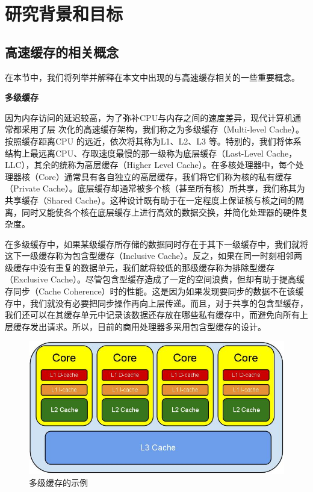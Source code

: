 
\chapter{研究背景和目标} \label{chap:related}
\section{高速缓存的相关概念}
在本节中，我们将列举并解释在本文中出现的与高速缓存相关的一些重要概念。

\textbf{多级缓存}

因为内存访问的延迟较高，为了弥补CPU与内存之间的速度差异，现代计算机通常都采用了层
次化的高速缓存架构，我们称之为多级缓存（Multi-level Cache）。按照缓存距离CPU 的远近，依次将其称为L1、L2、L3 等。特别的，我们将体系结构上最远离CPU、存取速度最慢的那一级称为底层缓存（Last-Level Cache，LLC），其余的统称为高层缓存（Higher Level Cache）。在多核处理器中，每个处理器核（Core）通常具有各自独立的高层缓存，我们将它们称为核的私有缓存（Private Cache）。底层缓存却通常被多个核（甚至所有核）所共享，我们称其为共享缓存（Shared Cache）。这种设计既有助于在一定程度上保证核与核之间的隔离，同时又能使各个核在底层缓存上进行高效的数据交换，并简化处理器的硬件复杂度。

在多级缓存中，如果某级缓存所存储的数据同时存在于其下一级缓存中，我们就将这下一级缓存称为包含型缓存（Inclusive Cache）。反之，如果在同一时刻相邻两级缓存中没有重复的数据单元，我们就将较低的那级缓存称为排除型缓存（Exclusive Cache）。尽管包含型缓存造成了一定的空间浪费，但却有助于提高缓存同步（Cache Coherence）时的性能。这是因为如果发现要同步的数据不在该缓存中，我们就没有必要把同步操作再向上层传递。而且，对于共享的包含型缓存，我们还可以在其缓存单元中记录该数据还存放在哪些私有缓存中，而避免向所有上层缓存发出请求。所以，目前的商用处理器多采用包含型缓存的设计。

\begin{figure}[htbp] 
    \centering
    \includegraphics[width=0.8\linewidth]{figures/CacheHierarchy.jpg}
    \caption{多级缓存的示例}
    \label{fig:cache_hierarchy}
\end{figure}

